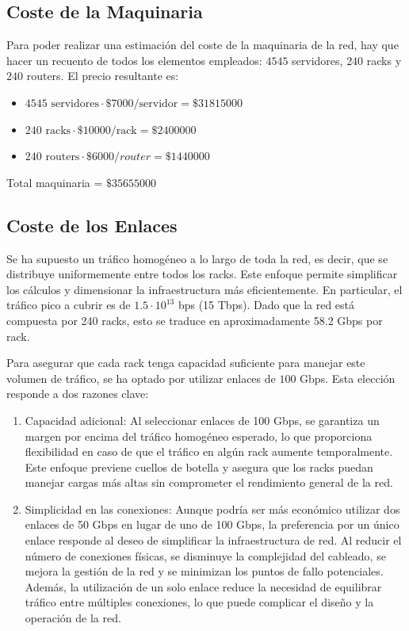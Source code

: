 \documentclass[%
    school=etsisi,%
    degree=61TI,%
]{upm-report}
\begin{document}
\subsection{Coste de la Maquinaria}
\label{subsec:coste-maquinaria}

Para poder realizar una estimación del coste de la maquinaria de la red, hay que hacer un recuento de todos los elementos empleados: $4545$ servidores, $240$ racks y $240$ routers. El precio resultante es:

\begin{itemize}
    \item $4545 \text{ servidores} \cdot \$ 7000 /\text{servidor} = \$ 31815000$
    \item $240 \text{ racks} \cdot \$ 10000 /\text{rack} = \$ 2400000$
    \item $240 \text{ routers} \cdot \$ 6000 /router = \$ 1440000$
\end{itemize}

Total maquinaria = $\$ 35655000$

\subsection{Coste de los Enlaces}
\label{subsec:coste-enlaces}

Se ha supuesto un tráfico homogéneo a lo largo de toda la red, es decir, que se distribuye uniformemente entre todos los racks. Este enfoque permite simplificar los cálculos y dimensionar la infraestructura más eficientemente. En particular, el tráfico pico a cubrir es de $1.5 \cdot 10^{13}$ bps (15 Tbps). Dado que la red está compuesta por 240 racks, esto se traduce en aproximadamente 58.2 Gbps por rack.

Para asegurar que cada rack tenga capacidad suficiente para manejar este volumen de tráfico, se ha optado por utilizar enlaces de $100$ Gbps. Esta elección responde a dos razones clave:

\begin{enumerate}
    \item Capacidad adicional: Al seleccionar enlaces de 100 Gbps, se garantiza un margen por encima del tráfico homogéneo esperado, lo que proporciona flexibilidad en caso de que el tráfico en algún rack aumente temporalmente. Este enfoque previene cuellos de botella y asegura que los racks puedan manejar cargas más altas sin comprometer el rendimiento general de la red.
    \item Simplicidad en las conexiones: Aunque podría ser más económico utilizar dos enlaces de 50 Gbps en lugar de uno de 100 Gbps, la preferencia por un único enlace responde al deseo de simplificar la infraestructura de red. Al reducir el número de conexiones físicas, se disminuye la complejidad del cableado, se mejora la gestión de la red y se minimizan los puntos de fallo potenciales. Además, la utilización de un solo enlace reduce la necesidad de equilibrar tráfico entre múltiples conexiones, lo que puede complicar el diseño y la operación de la red.
\end{enumerate}
\end{document}
